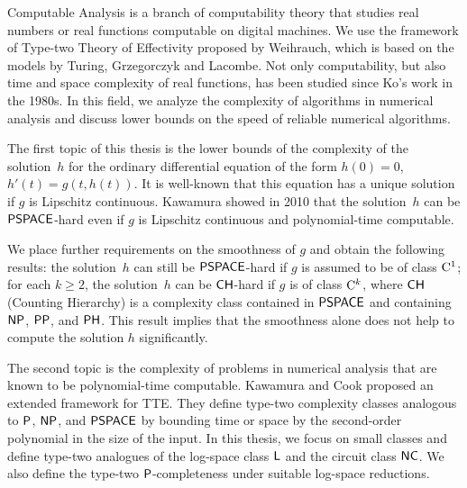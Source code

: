 \begin{eabstract}
Computable Analysis is a branch of computability theory that
studies real numbers or real functions computable on digital machines.
We use the framework of Type-two Theory of Effectivity proposed by Weihrauch,
which is based on the models by Turing, Grzegorczyk and Lacombe.
Not only computability, but also time and space complexity of real functions, 
has been studied since Ko's work in the 1980s. 
In this field,
we analyze the complexity of algorithms in numerical analysis 
and discuss lower bounds on the speed of reliable numerical algorithms.

The first topic of this thesis is the lower bounds of the complexity of the solution~$h$
for the ordinary differential equation of the form 
$h(0)=0$, $h'(t) = g(t, h(t))$.
It is well-known that this equation has a unique solution if $g$ is Lipschitz continuous.
Kawamura showed in 2010 that the solution~$h$ can be $\mathsf{PSPACE}$-hard
even if $g$ is Lipschitz continuous and polynomial-time computable. 


We place further requirements on the smoothness of $g$ 
and obtain the following results: 
the solution~$h$ can still be $\mathsf{PSPACE}$-hard
if $g$ is assumed to be of class $\mathrm C ^1$; 
for each $k \geq 2$, 
the solution~$h$ can be $\mathsf{CH}$-hard
if $g$ is of class $\mathrm C ^k$,
where $\mathsf{CH}$ (Counting Hierarchy) is a complexity class contained in $\mathsf{PSPACE}$
and containing $\mathsf{NP}$, $\mathsf{PP}$, and $\mathsf{PH}$.
This result implies that the smoothness alone does not help to 
compute the solution $h$ significantly.


The second topic is the complexity of problems in numerical analysis 
that are known to be polynomial-time computable.
Kawamura and Cook proposed an extended framework for TTE.
They define type-two complexity classes analogous to $\mathsf{P}$, $\mathsf{NP}$,
and $\mathsf{PSPACE}$ by bounding time or space by the second-order polynomial
in the size of the input.
In this thesis, we focus on small classes
and define type-two analogues of the log-space class $\mathsf{L}$ and
the circuit class $\mathsf{NC}$.
We also define the type-two $\mathsf{P}$-completeness under suitable log-space reductions.


\end{eabstract}

